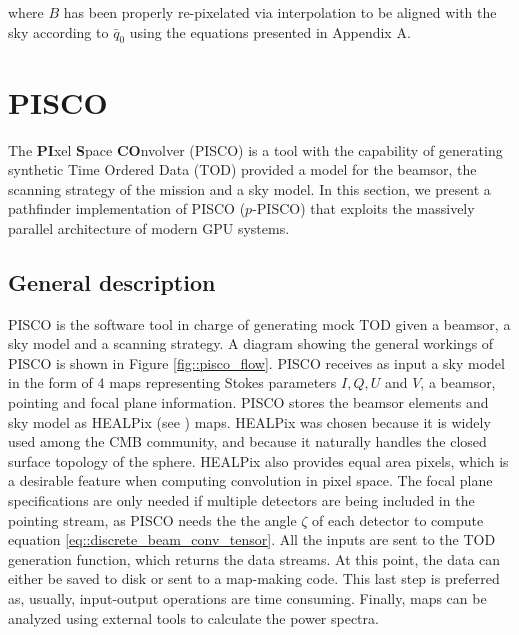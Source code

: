 \documentclass[a4paper,11pt]{article}
\begin{document}
\noindent
where $B$ has been properly re-pixelated via interpolation to be aligned with the sky according to $\bar{q}_0$ using the equations presented in Appendix A.

\section{PISCO}

The \textbf{PI}xel \textbf{S}pace \textbf{CO}nvolver (PISCO) is a tool with the capability of generating synthetic Time Ordered Data (TOD) provided a model for the beamsor, the scanning strategy of the mission and a sky model. In this section, we present a pathfinder implementation of PISCO ($p$-PISCO) that exploits the massively parallel architecture of modern GPU systems.

\subsection{General description}

PISCO is the software tool in charge of generating mock TOD given a beamsor, a sky model and a scanning strategy. A diagram showing the general workings of PISCO is shown in Figure \ref{fig::pisco_flow}. PISCO receives as input a sky model in the form of 4 maps representing Stokes parameters $I,Q,U$ and $V$, a beamsor, pointing and focal plane information. PISCO stores the beamsor elements and sky model as HEALPix (see \cite{2005ApJ...622..759G}) maps. HEALPix was chosen because it is widely used among the CMB community, and because it naturally handles the closed surface topology of the sphere. HEALPix also provides equal area pixels, which is a desirable feature when computing convolution in pixel space. The focal plane specifications are only needed if multiple detectors are being included in the pointing stream, as PISCO needs the the angle $\zeta$ of each detector to compute equation \ref{eq::discrete_beam_conv_tensor}. All the inputs are sent to the TOD generation function, which returns the data streams. At this point, the data can either be saved to disk or sent to a map-making code. This last step is preferred as, usually, input-output operations are time consuming. Finally, maps can be analyzed using external tools to calculate the power spectra.
\end{document}
